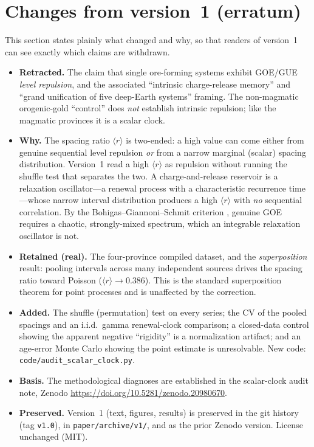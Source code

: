 \documentclass[12pt,a4paper]{article}
\newcommand{\rbar}{\langle r\rangle}
\begin{document}
\section{Changes from version~1 (erratum)}
\label{sec:changes}

This section states plainly what changed and why, so that readers of version~1 can
see exactly which claims are withdrawn.

\begin{itemize}
\item \textbf{Retracted.} The claim that single ore-forming systems exhibit
GOE/GUE \emph{level repulsion}, and the associated ``intrinsic charge-release
memory'' and ``grand unification of five deep-Earth systems'' framing. The
non-magmatic orogenic-gold ``control'' does \emph{not} establish intrinsic
repulsion; like the magmatic provinces it is a scalar clock.
\item \textbf{Why.} The spacing ratio $\rbar$ is two-ended: a high value can come
either from genuine sequential level repulsion \emph{or} from a narrow marginal
(scalar) spacing distribution. Version~1 read a high $\rbar$ as repulsion without
running the shuffle test that separates the two. A charge-and-release reservoir
is a relaxation oscillator---a renewal process with a characteristic recurrence
time---whose narrow interval distribution produces a high $\rbar$ with \emph{no}
sequential correlation. By the Bohigas--Giannoni--Schmit criterion
\citep{bgs1984}, genuine GOE requires a chaotic, strongly-mixed spectrum, which an
integrable relaxation oscillator is not.
\item \textbf{Retained (real).} The four-province compiled dataset, and the
\emph{superposition} result: pooling intervals across many independent sources
drives the spacing ratio toward Poisson ($\rbar\to0.386$). This is the standard
superposition theorem for point processes \citep{daley2003} and is unaffected by
the correction.
\item \textbf{Added.} The shuffle (permutation) test on every series; the
CV of the pooled spacings and an i.i.d.\ gamma renewal-clock comparison; a
closed-data control showing the apparent negative ``rigidity'' is a normalization
artifact; and an age-error Monte Carlo showing the point estimate is
unresolvable. New code: \texttt{code/audit\_scalar\_clock.py}.
\item \textbf{Basis.} The methodological diagnoses are established in the
scalar-clock audit note, Zenodo \url{https://doi.org/10.5281/zenodo.20980670}.
\item \textbf{Preserved.} Version~1 (text, figures, results) is preserved in the
git history (tag \texttt{v1.0}), in \texttt{paper/archive/v1/}, and as the prior
Zenodo version. License unchanged (MIT).
\end{itemize}
\end{document}
